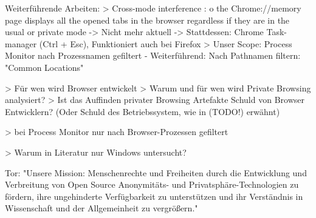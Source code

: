 Weiterführende Arbeiten:
> Cross-mode interference \cite{Hedberg.2013}:
	o	the Chrome://memory page displays all the opened tabs in the browser regardless if they are in the usual or private mode -> Nicht mehr aktuell -> Stattdessen: Chrome Task-manager (Ctrl + Esc), Funktioniert auch bei Firefox
> Unser Scope: Process Monitor nach Prozessnamen gefiltert
	- Weiterführend: Nach Pathnamen filtern: "Common Locations"

> Für wen wird Browser entwickelt
> Warum und für wen wird Private Browsing analysiert?
> Ist das Auffinden privater Browsing Artefakte Schuld von Browser Entwicklern? (Oder Schuld des Betriebssystem, wie in (TODO!) erwähnt)

> bei Process Monitor nur nach Browser-Prozessen gefiltert

> Warum in Literatur nur Windows untersucht?

Tor:
	"Unsere Mission:
	Menschenrechte und Freiheiten durch die Entwicklung und Verbreitung von Open Source Anonymitäts- und Privatsphäre-Technologien zu fördern, ihre ungehinderte Verfügbarkeit zu unterstützen und ihr Verständnis in Wissenschaft und der Allgemeinheit zu vergrößern."

